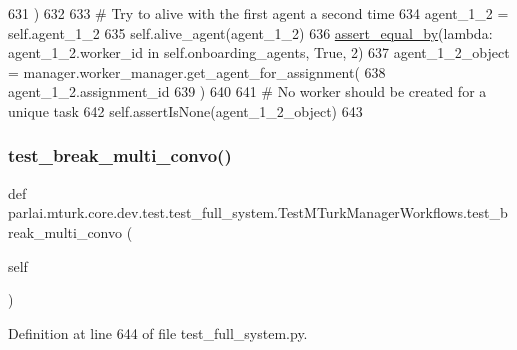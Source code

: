 \begin{DoxyCode}
631         )
632 
633         \textcolor{comment}{# Try to alive with the first agent a second time}
634         agent\_1\_2 = self.agent\_1\_2
635         self.alive\_agent(agent\_1\_2)
636         \hyperlink{namespaceparlai_1_1mturk_1_1core_1_1test_1_1test__full__system_a0b463246d35658a2e422010f13dcf819}{assert\_equal\_by}(\textcolor{keyword}{lambda}: agent\_1\_2.worker\_id \textcolor{keywordflow}{in} self.onboarding\_agents, \textcolor{keyword}{True}, 2)
637         agent\_1\_2\_object = manager.worker\_manager.get\_agent\_for\_assignment(
638             agent\_1\_2.assignment\_id
639         )
640 
641         \textcolor{comment}{# No worker should be created for a unique task}
642         self.assertIsNone(agent\_1\_2\_object)
643 
\end{DoxyCode}
\mbox{\label{classparlai_1_1mturk_1_1core_1_1dev_1_1test_1_1test__full__system_1_1TestMTurkManagerWorkflows_a78cac9cd90bba3563697fa94ae202d85}} 
\subsubsection{\texorpdfstring{test\+\_\+break\+\_\+multi\+\_\+convo()}{test\_break\_multi\_convo()}}
{\footnotesize\ttfamily def parlai.\+mturk.\+core.\+dev.\+test.\+test\+\_\+full\+\_\+system.\+Test\+M\+Turk\+Manager\+Workflows.\+test\+\_\+break\+\_\+multi\+\_\+convo (\begin{DoxyParamCaption}\item[{}]{self }\end{DoxyParamCaption})}



Definition at line 644 of file test\+\_\+full\+\_\+system.\+py.


